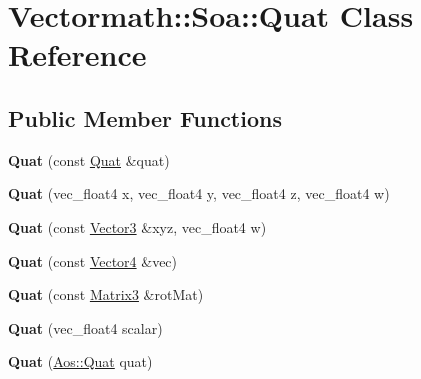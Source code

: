 \hypertarget{classVectormath_1_1Soa_1_1Quat}{\section{Vectormath\-:\-:Soa\-:\-:Quat Class Reference}
\label{classVectormath_1_1Soa_1_1Quat}
}
\subsection*{Public Member Functions}
\begin{DoxyCompactItemize}
\item 
\hypertarget{classVectormath_1_1Soa_1_1Quat_a19610ca1d1e3f1ddf4914545a2124a14}{{\bfseries Quat} (const \hyperlink{classVectormath_1_1Soa_1_1Quat}{Quat} \&quat)}\label{classVectormath_1_1Soa_1_1Quat_a19610ca1d1e3f1ddf4914545a2124a14}

\item 
\hypertarget{classVectormath_1_1Soa_1_1Quat_ac9eef8cf0b8edc1f73b5620cebbc7ad4}{{\bfseries Quat} (vec\-\_\-float4 x, vec\-\_\-float4 y, vec\-\_\-float4 z, vec\-\_\-float4 w)}\label{classVectormath_1_1Soa_1_1Quat_ac9eef8cf0b8edc1f73b5620cebbc7ad4}

\item 
\hypertarget{classVectormath_1_1Soa_1_1Quat_ae8daa26c2467693d1198fc4042c9a0eb}{{\bfseries Quat} (const \hyperlink{classVectormath_1_1Soa_1_1Vector3}{Vector3} \&xyz, vec\-\_\-float4 w)}\label{classVectormath_1_1Soa_1_1Quat_ae8daa26c2467693d1198fc4042c9a0eb}

\item 
\hypertarget{classVectormath_1_1Soa_1_1Quat_afa066ea471328c39877f4fca5278f51c}{{\bfseries Quat} (const \hyperlink{classVectormath_1_1Soa_1_1Vector4}{Vector4} \&vec)}\label{classVectormath_1_1Soa_1_1Quat_afa066ea471328c39877f4fca5278f51c}

\item 
\hypertarget{classVectormath_1_1Soa_1_1Quat_acbcf32cefc7ce414a883be906b9811cd}{{\bfseries Quat} (const \hyperlink{classVectormath_1_1Soa_1_1Matrix3}{Matrix3} \&rot\-Mat)}\label{classVectormath_1_1Soa_1_1Quat_acbcf32cefc7ce414a883be906b9811cd}

\item 
\hypertarget{classVectormath_1_1Soa_1_1Quat_a2daaa4afe6417c53ebe0c7c933407602}{{\bfseries Quat} (vec\-\_\-float4 scalar)}\label{classVectormath_1_1Soa_1_1Quat_a2daaa4afe6417c53ebe0c7c933407602}

\item 
\hypertarget{classVectormath_1_1Soa_1_1Quat_adde7f9915a32ac7ffa0822d1bf917210}{{\bfseries Quat} (\hyperlink{classVectormath_1_1Aos_1_1Quat}{Aos\-::\-Quat} quat)}\label{classVectormath_1_1Soa_1_1Quat_adde7f9915a32ac7ffa0822d1bf917210}


\end{DoxyCompactItemize}
